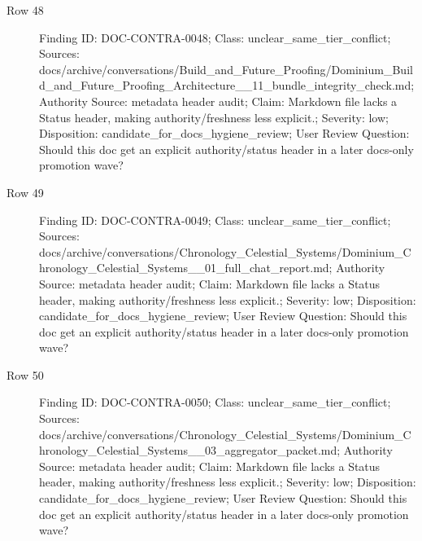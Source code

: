 \documentclass[10.5pt,a4paper,openany]{book}
\begin{document}
\begin{description}
\item[Row 48] Finding ID: DOC-\allowbreak{}CONTRA-\allowbreak{}0048; Class: unclear\_\allowbreak{}same\_\allowbreak{}tier\_\allowbreak{}conflict; Sources: docs/\allowbreak{}archive/\allowbreak{}conversations/\allowbreak{}Build\_\allowbreak{}and\_\allowbreak{}Future\_\allowbreak{}Proofing/\allowbreak{}Dominium\_\allowbreak{}Build\_\allowbreak{}and\_\allowbreak{}Future\_\allowbreak{}Proofing\_\allowbreak{}Architecture\_\allowbreak{}\_\allowbreak{}11\_\allowbreak{}bundle\_\allowbreak{}integrity\_\allowbreak{}check.\allowbreak{}md; Authority Source: metadata header audit; Claim: Markdown file lacks a Status header, making authority/\allowbreak{}freshness less explicit.\allowbreak{}; Severity: low; Disposition: candidate\_\allowbreak{}for\_\allowbreak{}docs\_\allowbreak{}hygiene\_\allowbreak{}review; User Review Question: Should this doc get an explicit authority/\allowbreak{}status header in a later docs-\allowbreak{}only promotion wave?
\item[Row 49] Finding ID: DOC-\allowbreak{}CONTRA-\allowbreak{}0049; Class: unclear\_\allowbreak{}same\_\allowbreak{}tier\_\allowbreak{}conflict; Sources: docs/\allowbreak{}archive/\allowbreak{}conversations/\allowbreak{}Chronology\_\allowbreak{}Celestial\_\allowbreak{}Systems/\allowbreak{}Dominium\_\allowbreak{}Chronology\_\allowbreak{}Celestial\_\allowbreak{}Systems\_\allowbreak{}\_\allowbreak{}01\_\allowbreak{}full\_\allowbreak{}chat\_\allowbreak{}report.\allowbreak{}md; Authority Source: metadata header audit; Claim: Markdown file lacks a Status header, making authority/\allowbreak{}freshness less explicit.\allowbreak{}; Severity: low; Disposition: candidate\_\allowbreak{}for\_\allowbreak{}docs\_\allowbreak{}hygiene\_\allowbreak{}review; User Review Question: Should this doc get an explicit authority/\allowbreak{}status header in a later docs-\allowbreak{}only promotion wave?
\item[Row 50] Finding ID: DOC-\allowbreak{}CONTRA-\allowbreak{}0050; Class: unclear\_\allowbreak{}same\_\allowbreak{}tier\_\allowbreak{}conflict; Sources: docs/\allowbreak{}archive/\allowbreak{}conversations/\allowbreak{}Chronology\_\allowbreak{}Celestial\_\allowbreak{}Systems/\allowbreak{}Dominium\_\allowbreak{}Chronology\_\allowbreak{}Celestial\_\allowbreak{}Systems\_\allowbreak{}\_\allowbreak{}03\_\allowbreak{}aggregator\_\allowbreak{}packet.\allowbreak{}md; Authority Source: metadata header audit; Claim: Markdown file lacks a Status header, making authority/\allowbreak{}freshness less explicit.\allowbreak{}; Severity: low; Disposition: candidate\_\allowbreak{}for\_\allowbreak{}docs\_\allowbreak{}hygiene\_\allowbreak{}review; User Review Question: Should this doc get an explicit authority/\allowbreak{}status header in a later docs-\allowbreak{}only promotion wave?

\end{description}
\end{document}
